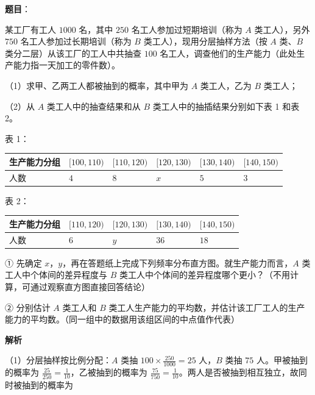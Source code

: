\begin{answer}

\textbf{题目}：

某工厂有工人 $1000$ 名，其中 $250$ 名工人参加过短期培训（称为 $A$ 类工人），另外 $750$ 名工人参加过长期培训（称为 $B$ 类工人），现用分层抽样方法（按 $A$ 类、$B$ 类分二层）从该工厂的工人中共抽查 $100$ 名工人，调查他们的生产能力（此处生产能力指一天加工的零件数）。

（1）求甲、乙两工人都被抽到的概率，其中甲为 $A$ 类工人，乙为 $B$ 类工人；

（2）从 $A$ 类工人中的抽查结果和从 $B$ 类工人中的抽插结果分别如下表 1 和表 2。

表 1：

\begin{center}
\begin{tabular}{llllll}
\toprule
生产能力分组 & $[100,110)$ & $[110,120)$ & $[120,130)$ & $[130,140)$ & $[140,150)$ \\
\midrule
人数 & $4$ & $8$ & $x$ & $5$ & $3$ \\
\bottomrule
\end{tabular}
\end{center}

表 2：

\begin{center}
\begin{tabular}{lllll}
\toprule
生产能力分组 & $[110,120)$ & $[120,130)$ & $[130,140)$ & $[140,150)$ \\
\midrule
人数 & $6$ & $y$ & $36$ & $18$ \\
\bottomrule
\end{tabular}
\end{center}

① 先确定 $x$，$y$，再在答题纸上完成下列频率分布直方图。就生产能力而言，$A$ 类工人中个体间的差异程度与 $B$ 类工人中个体间的差异程度哪个更小？（不用计算，可通过观察直方图直接回答结论）
\nopagebreak[4]
\begin{center}\end{center}
\nopagebreak[4]
② 分别估计 $A$ 类工人和 $B$ 类工人生产能力的平均数，并估计该工厂工人的生产能力的平均数。（同一组中的数据用该组区间的中点值作代表）

\textbf{解析}

（1）分层抽样按比例分配：$A$ 类抽 $100\times\frac{250}{1000}=25$ 人，$B$ 类抽 $75$ 人。甲被抽到的概率为 $\frac{25}{250}=\frac1{10}$，乙被抽到的概率为 $\frac{75}{750}=\frac1{10}$。两人是否被抽到相互独立，故同时被抽到的概率为


\end{answer}
